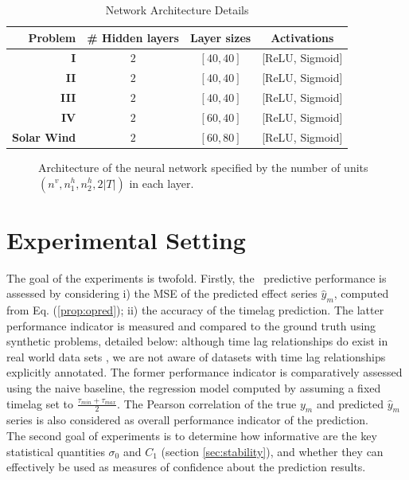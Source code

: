 \begin{table}[htbp]
  \caption{Network Architecture Details}\label{tab:arch_probs}
  \centering
  \begin{tabular}{ r c c c }
  \hline
  Problem &  \# Hidden layers & Layer sizes & Activations\\
  \hline
  \textbf{I} & $2$ & $[40, 40]$  & [ReLU, Sigmoid]\\
  \textbf{II} & $2$ & $[40, 40]$ & [ReLU, Sigmoid]\\
  \textbf{III} & $2$ & $[40, 40]$ & [ReLU, Sigmoid]\\
  \textbf{IV} & $2$ & $[60, 40]$ & [ReLU, Sigmoid]\\
  \textbf{Solar Wind} & $2$ & $[60, 80]$ & [ReLU, Sigmoid]\\
  \hline
  \end{tabular}
  \label{tab:exp}
\end{table}


\begin{figure}[ht]
\centerline{\resizebox*{0.7\textwidth}{!}{}}
\caption{\label{fig:archi} Architecture of the neural network specified by the number of units 
$(n^v,n_1^h,n_2^h,2\vert T\vert)$ in each layer.}
\label{fig:NN}
\end{figure}

\section{Experimental Setting}\label{sec:exp}\label{sec:benchmark}

The goal of the experiments is twofold. Firstly, the \XX\ predictive performance is assessed by considering i) the MSE of the predicted effect series $\hat y_m$, computed from Eq. (\ref{prop:opred}); 
ii) the accuracy of the timelag prediction. The latter performance indicator is measured and compared to the ground truth using synthetic problems, detailed below: although time lag relationships do exist in real world data sets \citep{doi:10.1002/jgra.50429,ZHOU2006195}, we are not aware of datasets with time lag relationships explicitly annotated. The former performance indicator is comparatively assessed using the naive baseline, the regression model computed by assuming a fixed timelag set to $\frac{\tau_{min}+\tau_{max}}{2}$. The Pearson correlation of the true $y_m$ and predicted $\hat y_m$ series is also considered as overall performance indicator of the prediction.\\
The second goal of experiments is to determine how informative are the key statistical quantities $\sigma_0$ and $C_1$ (section \ref{sec:stability}), and whether they can effectively be used as measures of confidence about the prediction results. 

